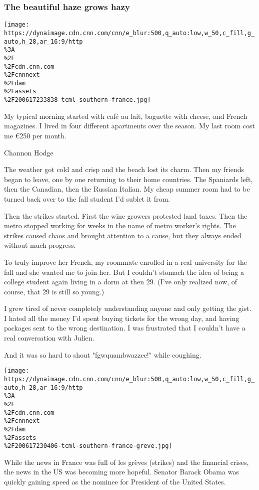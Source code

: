 \hypertarget{the-beautiful-haze-grows-hazy}{%
\subsubsection{The beautiful haze grows
hazy}\label{the-beautiful-haze-grows-hazy}}

\texttt{[image: https://dynaimage.cdn.cnn.com/cnn/e\_blur:500,q\_auto:low,w\_50,c\_fill,g\_auto,h\_28,ar\_16:9/http\\\%3A\\\%2F\\\%2Fcdn.cnn.com\\\%2Fcnnnext\\\%2Fdam\\\%2Fassets\\\%2F200617233838-tcml-southern-france.jpg]}

My typical morning started with café au lait, baguette with cheese, and
French magazines. I lived in four different apartments over the season.
My last room cost me €250 per month.

Channon Hodge

The weather got cold and crisp and the beach lost its charm. Then my
friends began to leave, one by one returning to their home countries.
The Spaniards left, then the Canadian, then the Russian Italian. My
cheap summer room had to be turned back over to the fall student I'd
sublet it from.

Then the strikes started. First the wine growers protested land taxes.
Then the metro stopped working for weeks in the name of metro worker's
rights. The strikes caused chaos and brought attention to a cause, but
they always ended without much progress.

To truly improve her French, my roommate enrolled in a real university
for the fall and she wanted me to join her. But I couldn't stomach the
idea of being a college student again living in a dorm at then 29. (I've
only realized now, of course, that 29 is still so young.)

I grew tired of never completely understanding anyone and only getting
the gist. I hated all the money I'd spent buying tickets for the wrong
day, and having packages sent to the wrong destination. I was frustrated
that I couldn't have a real conversation with Julien.

And it was so hard to shout "fgwquambwazzee!" while coughing.

\texttt{[image: https://dynaimage.cdn.cnn.com/cnn/e\_blur:500,q\_auto:low,w\_50,c\_fill,g\_auto,h\_28,ar\_16:9/http\\\%3A\\\%2F\\\%2Fcdn.cnn.com\\\%2Fcnnnext\\\%2Fdam\\\%2Fassets\\\%2F200617230406-tcml-southern-france-greve.jpg]}

While the news in France was full of les grèves (strikes) and the
financial crises, the news in the US was becoming more hopeful. Senator
Barack Obama was quickly gaining speed as the nominee for President of
the United States.

